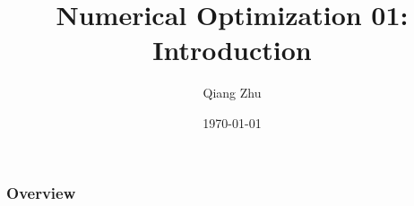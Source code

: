 \documentclass{beamer}
\title[Optimization]{Numerical Optimization 01: Introduction} %
\author{Qiang Zhu} %
\institute[University of Nevada Las Vegas] %
{
University of Nevada Las Vegas\\ %
\medskip
}
\date{\today} %
\begin{document}
\begin{frame}
\titlepage %
\end{frame}

\begin{frame}
\frametitle{Overview} %
\tableofcontents %
\end{frame}


\end{document}

